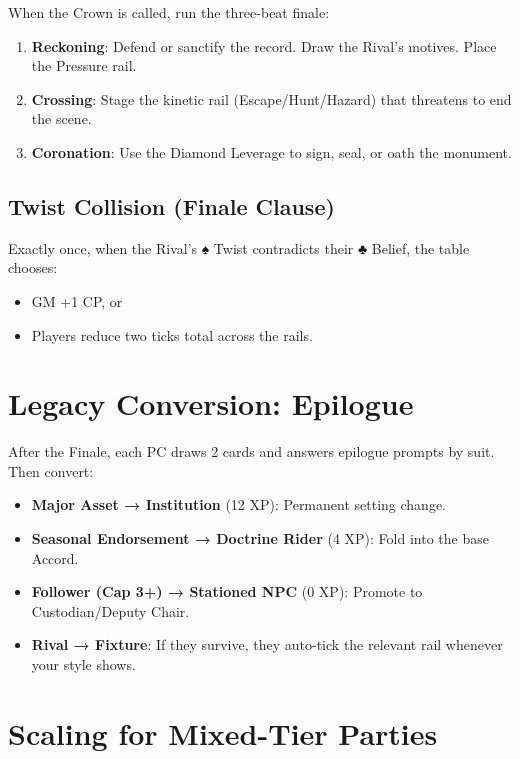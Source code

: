When the Crown is called, run the three-beat finale:

\begin{enumerate}
    \item \textbf{Reckoning}: Defend or sanctify the record. Draw the Rival's motives. Place the Pressure rail.
    \item \textbf{Crossing}: Stage the kinetic rail (Escape/Hunt/Hazard) that threatens to end the scene.
    \item \textbf{Coronation}: Use the Diamond Leverage to sign, seal, or oath the monument.
\end{enumerate}

\subsection*{Twist Collision (Finale Clause)}

Exactly once, when the Rival's ♠ Twist contradicts their ♣ Belief, the table chooses:

\begin{itemize}
    \item GM +1 CP, or
    \item Players reduce two ticks total across the rails.
\end{itemize}

\section*{Legacy Conversion: Epilogue}

After the Finale, each PC draws 2 cards and answers epilogue prompts by suit. Then convert:

\begin{itemize}
    \item \textbf{Major Asset → Institution} (12 XP): Permanent setting change.
    \item \textbf{Seasonal Endorsement → Doctrine Rider} (4 XP): Fold into the base Accord.
    \item \textbf{Follower (Cap 3+) → Stationed NPC} (0 XP): Promote to Custodian/Deputy Chair.
    \item \textbf{Rival → Fixture}: If they survive, they auto-tick the relevant rail whenever your style shows.
\end{itemize}

\section*{Scaling for Mixed-Tier Parties}

